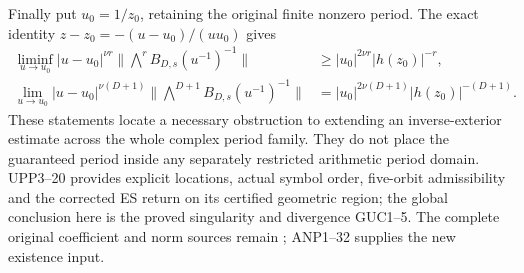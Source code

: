 Finally put $u_0=1/z_0$, retaining the original finite nonzero period.
The exact identity
$z-z_0=-(u-u_0)/(uu_0)$ gives
\[
 \begin{split}
 \liminf_{u\to u_0}|u-u_0|^{\nu r}
       \|\bigwedge^r B_{D,s}(u^{-1})^{-1}\|
       &\ge |u_0|^{2\nu r}|h(z_0)|^{-r},\\
 \lim_{u\to u_0}|u-u_0|^{\nu(D+1)}
       \|\bigwedge^{D+1}B_{D,s}(u^{-1})^{-1}\|
       &=|u_0|^{2\nu(D+1)}|h(z_0)|^{-(D+1)}.
 \end{split}\tag{GUC5}
\]
These statements locate a necessary obstruction to extending an
inverse-exterior estimate across the whole complex period family.
They do not place the guaranteed period inside any separately
restricted arithmetic period domain. UPP3--20 provides explicit
locations, actual symbol order, five-orbit admissibility and the
corrected ES return on its certified geometric region; the global
conclusion here is the proved singularity and divergence GUC1--5.
The complete original coefficient and norm sources remain
\cite{PCLOriginal,WCF}; ANP1--32 supplies the new existence input.
